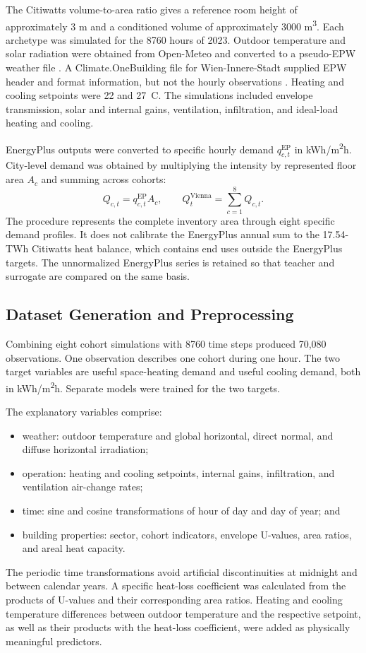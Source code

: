 \documentclass[conference]{IEEEtran}
\begin{document}
The Citiwatts volume-to-area ratio gives a reference room height of
approximately 3 m and a conditioned volume of approximately 3000
m\textsuperscript{3}. Each archetype was simulated for the 8760 hours of 2023.
Outdoor temperature and solar radiation were obtained from Open-Meteo and
converted to a pseudo-EPW weather file \cite{Zippenfenig2023}. A
Climate.OneBuilding file
for Wien-Innere-Stadt supplied EPW header and format information, but not the
hourly observations \cite{ClimateOneBuilding2026}. Heating and cooling setpoints were 22 and
27~\textdegree C. The simulations included envelope transmission, solar and
internal gains, ventilation, infiltration, and ideal-load heating and cooling.

EnergyPlus outputs were converted to specific hourly demand
$q_{c,t}^{\mathrm{EP}}$ in kWh/m\textsuperscript{2}h. City-level demand was
obtained by multiplying the intensity by represented floor area $A_c$ and
summing across cohorts:
\begin{equation}
Q_{c,t}=q_{c,t}^{\mathrm{EP}}A_c,\qquad
Q_t^{\mathrm{Vienna}}=\sum_{c=1}^{8}Q_{c,t}.
\label{eq:aggregation}
\end{equation}
The procedure represents the complete inventory area through eight specific
demand profiles. It does not calibrate the EnergyPlus annual sum to the
17.54-TWh Citiwatts heat balance, which contains end uses outside the
EnergyPlus targets. The unnormalized EnergyPlus series is retained so that
teacher and surrogate are compared on the same basis.

\subsection{Dataset Generation and Preprocessing}

Combining eight cohort simulations with 8760 time steps produced 70,080
observations. One observation describes one cohort during one hour. The two
target variables are useful space-heating demand and useful cooling demand,
both in kWh/m\textsuperscript{2}h. Separate models were trained for the two
targets.

The explanatory variables comprise:
\begin{itemize}
\item weather: outdoor temperature and global horizontal, direct normal, and
diffuse horizontal irradiation;
\item operation: heating and cooling setpoints, internal gains, infiltration,
and ventilation air-change rates;
\item time: sine and cosine transformations of hour of day and day of year;
and
\item building properties: sector, cohort indicators, envelope U-values,
area ratios, and areal heat capacity.
\end{itemize}
The periodic time transformations avoid artificial discontinuities at midnight
and between calendar years. A specific heat-loss coefficient was calculated
from the products of U-values and their corresponding area ratios. Heating and
cooling temperature differences between outdoor temperature and the respective
setpoint, as well as their products with the heat-loss coefficient, were added
as physically meaningful predictors.
\end{document}
